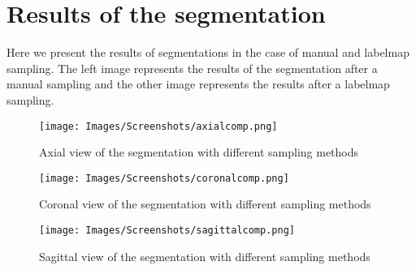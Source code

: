 \chapter{Results of the segmentation}\label{app:results}
Here we present the results of segmentations in the case of manual and labelmap sampling. The left image represents the results of the segmentation after a manual sampling and the other image represents the results after a labelmap sampling.


  \begin{figure}[htb]\centering
  \texttt{[image: Images/Screenshots/axialcomp.png]}
  \caption{Axial view of the segmentation with different sampling methods}
  \end{figure}


  \begin{figure}[htb]\centering
  \texttt{[image: Images/Screenshots/coronalcomp.png]}
  \caption{Coronal view of the segmentation with different sampling methods}
  \end{figure}


  \begin{figure}[htb]\centering
  \texttt{[image: Images/Screenshots/sagittalcomp.png]}
  \caption{Sagittal view of the segmentation with different sampling methods}\label{fig:NC_C_L}
  \end{figure}